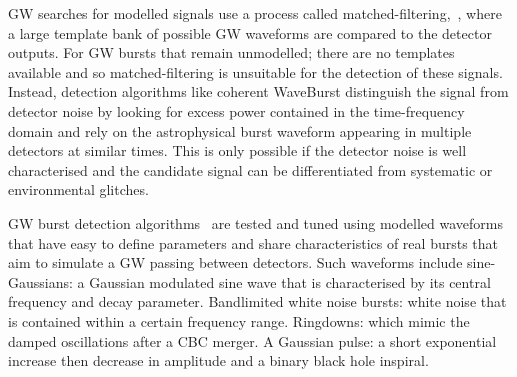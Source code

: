 \documentclass[12pt]{iopart}
\newcommand{\chris}[1]{\textbf{\textcolor{green}{CHRIS: #1}}}
\begin{document}
%
\ac{GW} searches for modelled signals use a process called
matched-filtering,~\cite{Owen1998,Usman_2016,sachdev2019gstlal}, where a large template bank of possible
\ac{GW} waveforms are compared to the detector outputs. For \ac{GW} bursts that remain unmodelled; there are no
templates available and so matched-filtering is unsuitable for the detection of
these signals.  Instead, detection algorithms like coherent WaveBurst \cite{drago2020coherent} distinguish the signal from
detector noise by looking for excess power contained in the time-frequency
domain and rely on the
astrophysical burst waveform appearing in multiple detectors at similar times.
This is only possible if the detector noise is well characterised and the
candidate signal can be differentiated from systematic or environmental
glitches. 

%
\ac{GW} burst detection algorithms~\cite{drago2020coherent,Klimenko_2008, Aso_2008} are tested
and tuned using modelled waveforms that have easy to define parameters and share characteristics of real bursts that aim to simulate a \ac{GW} passing between
detectors. Such waveforms include sine-Gaussians: a
Gaussian modulated sine wave that is characterised by its central frequency and
decay parameter. Bandlimited white noise bursts: white noise that is contained
within a certain frequency range. Ringdowns: which mimic the damped
oscillations after a \ac{CBC} merger. A Gaussian pulse: a short exponential increase then decrease in amplitude and a binary black hole inspiral.
%

\end{document}
